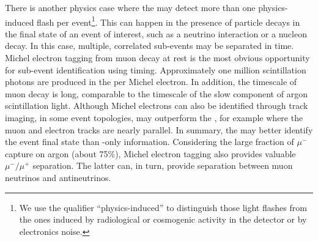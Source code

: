 There is another physics case where the  may detect more than one physics-induced flash per  event\footnote{We use the qualifier ``physics-induced'' to distinguish those light flashes from the ones induced by radiological or cosmogenic activity in the detector or by electronics noise.}. This can happen in the presence of particle decays in the final state of an event of interest, such as a neutrino interaction or a nucleon decay. In this case, multiple, correlated sub-events may be separated in time. Michel electron tagging from muon decay at rest is the most obvious opportunity for sub-event identification using  timing. Approximately one million scintillation photons are produced in the  per Michel electron. In addition, the timescale of muon decay is long, comparable to the timescale of the slow component of argon scintillation light. Although Michel electrons can also be identified through  track imaging, in some event topologies,   may outperform the , for example where the muon and electron tracks are nearly parallel. In summary, the  may better identify the event final state than -only information. Considering the large fraction of $\mu^-$ capture on argon (about 75\%), Michel electron tagging also provides valuable $\mu^-/\mu^+$ separation. The latter can, in turn, provide separation between muon neutrinos and antineutrinos. 
